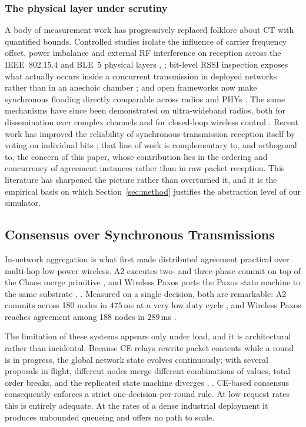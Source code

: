 \documentclass[journal]{IEEEtran}
\newcommand{\CE}{CE}                      %
\begin{document}
\subsubsection{The physical layer under scrutiny}
A body of measurement work has progressively replaced folklore about CT
with quantified bounds. Controlled studies isolate the influence of
carrier frequency offset, power imbalance and external RF interference on
reception across the IEEE~802.15.4 and BLE~5 physical layers
\cite{baddeley20phy}, \cite{baddeley23understanding}; bit-level RSSI
inspection exposes what actually occurs inside a concurrent transmission
in deployed networks rather than in an anechoic chamber
\cite{herrmann22rssispy}; and open frameworks now make synchronous
flooding directly comparable across radios and PHYs
\cite{baddeley22osf}. The same mechanisms have since been demonstrated on
ultra-wideband radios, both for dissemination over complex channels
\cite{schuh24uwb} and for closed-loop wireless control
\cite{trobinger24uwbcontrol}. Recent work has improved the reliability of
synchronous-transmission reception itself by voting on individual bits
\cite{rangwala24stxvote}; that line of work is complementary to, and
orthogonal to, the concern of this paper, whose contribution lies in the
ordering and concurrency of agreement instances rather than in raw packet
reception. This literature has sharpened the picture
rather than overturned it, and it is the empirical basis on which
Section~\ref{sec:method} justifies the abstraction level of our simulator.

\subsection{Consensus over Synchronous Transmissions}
\label{sec:back-consensus}

In-network aggregation is what first made distributed agreement practical
over multi-hop low-power wireless. A2 executes two- and three-phase commit
on top of the Chaos merge primitive \cite{alnahas17a2}, and Wireless Paxos
ports the Paxos state machine to the same substrate
\cite{poirot19paxos}, \cite{poirot20thesis}. Measured on a single
decision, both are remarkable: A2 commits across 180 nodes in
$475$\,ms at a very low duty cycle \cite{alnahas17a2}, and Wireless Paxos
reaches agreement among 188 nodes in $289$\,ms \cite{poirot19paxos}.

The limitation of these systems appears only under load, and it is
architectural rather than incidental. Because \CE{} relays rewrite packet
contents while a round is in progress, the global network state evolves
continuously; with several proposals in flight, different nodes merge
different combinations of values, total order breaks, and the replicated
state machine diverges \cite{alnahas17a2}, \cite{poirot20thesis}.
\CE-based consensus consequently enforces a strict one-decision-per-round
rule. At low request rates this is entirely adequate. At the rates of a
dense industrial deployment it produces unbounded queueing and offers no
path to scale.
\end{document}
